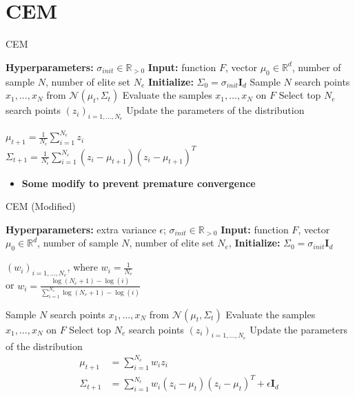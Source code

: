 \documentclass{book}
\begin{document}
\section{CEM}
\begin{algorithm}[]
\caption{CEM}
\label{alg:cem}
\begin{algorithmic}[1]
    \STATE \textbf{Hyperparameters:} $\sigma_{init} \in \mathbb{R}_{>0}$
    \STATE \textbf{Input:} function $F$, vector $\mu_0 \in \mathbb{R}^d$,
    \STATE number of sample $N$, number of elite set $N_e$
    \STATE \textbf{Initialize:} $\Sigma_0 = \sigma_{init}\mathbf{I}_d$
    \STATE
        \STATE Sample $N$ search points $x_1, \dots, x_N$ from $\mathcal{N}(\mu_t, \Sigma_t)$
        \STATE Evaluate the samples $x_1, \dots, x_N$ on $F$
        \STATE Select top $N_e$ search points $(z_i)_{i=1, \dots, N_e}$
        \STATE Update the parameters of the distribution 
        \begin{center}
            $\displaystyle \mu_{t+1} = \frac{1}{N_{\epsilon}} \sum_{i=1}^{N_{\epsilon}} z_i$ \\
            $\displaystyle \Sigma_{t+1} = \frac{1}{N_{\epsilon}} \sum_{i=1}^{N_{\epsilon}} (z_i - \mu_{t+1})(z_i - \mu_{t+1})^T$
        \end{center}
    \ENDFOR
\end{algorithmic}
\end{algorithm}
\begin{itemize}
    \item \textbf{Some modify to prevent premature convergence}
\end{itemize}
\begin{algorithm}
\caption{CEM (Modified)}
\label{alg:cem_modified}
    \begin{algorithmic}[1]
        \STATE \textbf{Hyperparameters:} extra variance $\epsilon$; $\sigma_{init} \in \mathbb{R}_{>0}$
        \STATE \textbf{Input:} function $F$, vector $\mu_0 \in \mathbb{R}^d$,
        \STATE number of sample $N$, number of elite set $N_e$,
        \STATE \textbf{Initialize:} $\Sigma_0 = \sigma_{init} \mathbf{I}_d$
        \begin{center}
        $(w_i)_{i=1,...,N_e}$, where $w_i = \frac{1}{N_e}$ \\
         or $w_i = \frac{\log(N_e+1) - \log(i)}{\sum_{i=1}^{N_e} \log(N_e+1) - \log(i)}$
        \end{center}
            \STATE Sample $N$ search points $x_1, \dots, x_N$ from $\mathcal{N}(\mu_t, \Sigma_t)$
            \STATE Evaluate the samples $x_1, \dots, x_N$ on $F$
            \STATE Select top $N_e$ search points $(z_i)_{i=1,...,N_e}$
            \STATE Update the parameters of the distribution
            \begin{align*}
                \mu_{t+1} &= \sum_{i=1}^{N_e} w_i z_i \\
                \Sigma_{t+1} &= \sum_{i=1}^{N_e} w_i (z_i - \mu_t)(z_i - \mu_t)^T + \epsilon \mathbf{I}_d
            \end{align*}
        \ENDFOR
    \end{algorithmic}
\end{algorithm}
\end{document}
